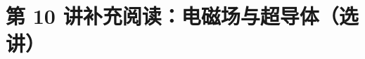 \documentclass[UTF8,zihao=-4,oneside,openany]{ctexbook}
\begin{document}
\setcounter{page}{1}
\setcounter{equation}{0}

\section*{第 10 讲\quad 补充阅读：电磁场与超导体（选讲）}


\end{document}
